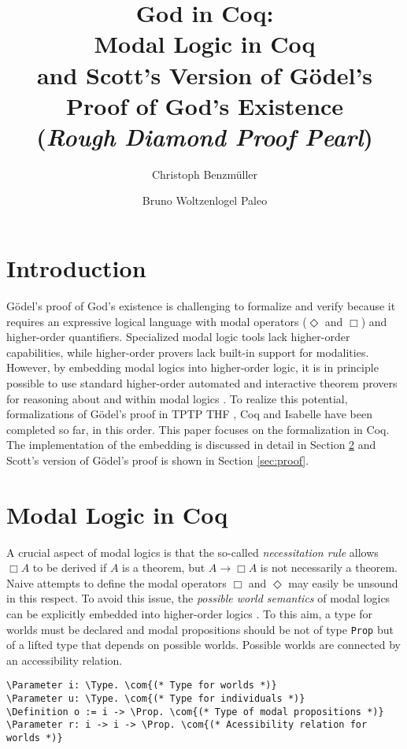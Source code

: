 \documentclass{llncs}
\title{
God in Coq: \\
Modal Logic in Coq \\ 
and Scott's Version of G\"{o}del's Proof of God's Existence \\
{\small (\emph{Rough Diamond Proof Pearl})}
}
\author{
  Christoph Benzm\"{u}ller\inst{1} 
  \and 
  Bruno Woltzenlogel Paleo\inst{2}
}
\institute{
  Dahlem Center for Intelligent Systems, Freie Universit\"{a}t Berlin, Germany\\
  \email{c.benzmueller@gmail.com}
  \and 
  Theory and Logic Group, Vienna University of Technology, Austria \\
  \email{bruno@logic.at}
}
\newcommand{\imp}{\rightarrow}
\newcommand{\red}[1]{\textcolor[rgb]{1,0,0}{#1}}
\newcommand{\blue}[1]{\textcolor[rgb]{0,0,1}{#1}}
\newcommand{\brown}[1]{\textcolor[rgb]{0.8,0.6,0.4}{#1}}
\newcommand{\Parameter}{\red{Parameter}}
\newcommand{\Definition}{\red{Definition}}
\newcommand{\Prop}{\blue{Prop}}
\newcommand{\Type}{\blue{Type}}
\newcommand{\com}[1]{\brown{#1}}
\begin{document}
\maketitle

\section{Introduction}

G\"{o}del's proof of God's existence is challenging 
to formalize and verify because it requires an 
expressive logical language with modal operators
($\Diamond$ and $\Box$) and
higher-order quantifiers. 
Specialized modal logic tools lack higher-order capabilities, 
while higher-order provers lack built-in support for modalities. 
However, by embedding modal logics into higher-order logic, 
it is in principle possible to use standard 
higher-order automated and interactive theorem provers 
for reasoning about and within modal logics \cite{J23,B9}.
To realize this potential, formalizations \cite{FormalTheologyRepository} of G\"odel's proof in TPTP THF \cite{J22}, Coq \cite{Coq} and Isabelle \cite{Isabelle} have been completed so far, in this order. This paper focuses on the formalization in Coq. The implementation of the embedding is discussed in detail in Section \ref{sec:modal} and Scott's version of G\"odel's proof is shown in Section \ref{sec:proof}.


\section{Modal Logic in Coq}
\label{sec:modal}

A crucial aspect of modal logics \cite{ToDo} is that the so-called \emph{necessitation rule} allows $\Box A$ to be derived if $A$ is a theorem, but $A \imp \Box A$ is not necessarily a theorem. Naive attempts to define the modal operators $\Box$ and $\Diamond$ may easily be unsound in this respect. To avoid this issue, the \emph{possible world semantics} of modal logics can be explicitly embedded into higher-order logics \cite{J23,B9}. To this aim, a type for worlds must be declared and modal propositions should be not of type \texttt{Prop} but of a lifted type that depends on possible worlds. Possible worlds are connected by an accessibility relation.

\newcommand{\verbsize}{\small}

\begin{small}
\begin{Verbatim}[commandchars=\\\{\},fontsize=\verbsize]
\Parameter i: \Type. \com{(* Type for worlds *)}
\Parameter u: \Type. \com{(* Type for individuals *)}
\Definition o := i -> \Prop. \com{(* Type of modal propositions *)}
\Parameter r: i -> i -> \Prop. \com{(* Acessibility relation for worlds *)}
\end{Verbatim}
\end{small}
\end{document}
